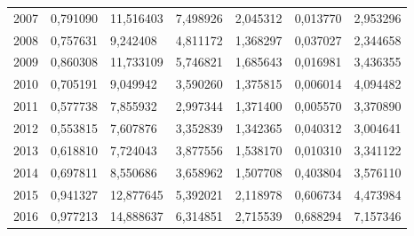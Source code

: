 \begin{table}
\begin{tabular}{p{1cm}p{2cm}p{2cm}p{2cm}p{2cm}p{2cm}p{2cm}}
 2007 &                            0,791090 &                                   11,516403 &                            7,498926 &                                     2,045312 &                                    0,013770 &                    2,953296 \\
 2008 &                            0,757631 &                                    9,242408 &                            4,811172 &                                     1,368297 &                                    0,037027 &                    2,344658 \\
 2009 &                            0,860308 &                                   11,733109 &                            5,746821 &                                     1,685643 &                                    0,016981 &                    3,436355 \\
 2010 &                            0,705191 &                                    9,049942 &                            3,590260 &                                     1,375815 &                                    0,006014 &                    4,094482 \\
 2011 &                            0,577738 &                                    7,855932 &                            2,997344 &                                     1,371400 &                                    0,005570 &                    3,370890 \\
 2012 &                            0,553815 &                                    7,607876 &                            3,352839 &                                     1,342365 &                                    0,040312 &                    3,004641 \\
 2013 &                            0,618810 &                                    7,724043 &                            3,877556 &                                     1,538170 &                                    0,010310 &                    3,341122 \\
 2014 &                            0,697811 &                                    8,550686 &                            3,658962 &                                     1,507708 &                                    0,403804 &                    3,576110 \\
 2015 &                            0,941327 &                                   12,877645 &                            5,392021 &                                     2,118978 &                                    0,606734 &                    4,473984 \\
 2016 &                            0,977213 &                                   14,888637 &                            6,314851 &                                     2,715539 &                                    0,688294 &                    7,157346 \\
\bottomrule
\end{tabular}
\end{table}

